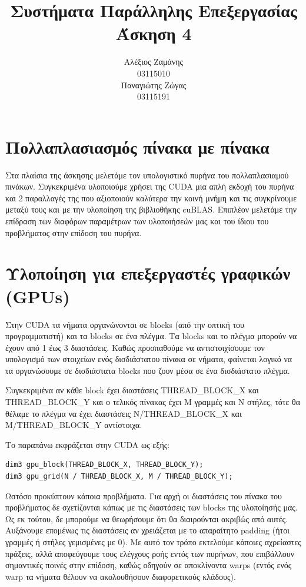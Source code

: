 \documentclass[titlepage]{article}
\begin{document}
\title{Συστήματα Παράλληλης Επεξεργασίας\\
    Άσκηση 4}
\author{Αλέξιος Ζαμάνης\\
    03115010\\
    Παναγιώτης Ζώγας\\
    03115191}

\maketitle

\section*{Πολλαπλασιασμός πίνακα με πίνακα}

Στα πλαίσια της άσκησης μελετάμε τον υπολογιστικό πυρήνα του πολλαπλασιαμού πινάκων. Συγκεκριμένα υλοποιούμε χρήσει της CUDA μια απλή εκδοχή του πυρήνα και 2 παραλλαγές της που αξιοποιούν καλύτερα την κοινή μνήμη και τις συγκρίνουμε μεταξύ τους και με την υλοποίηση της βιβλιοθήκης cuBLAS. Επιπλέον μελετάμε την επίδραση των διαφόρων παραμέτρων των υλοποιήσεών μας και του ίδιου του προβλήματος στην επίδοση του πυρήνα.

\section{Υλοποίηση για επεξεργαστές γραφικών (GPUs)}

Στην CUDA τα νήματα οργανώνονται σε blocks (από την οπτική του προγραμματιστή) και τα blocks σε ένα πλέγμα. Τα blocks και το πλέγμα μπορούν να έχουν από 1 έως 3 διαστάσεις. Καθώς προσπαθούμε να αντιστοιχίσουμε τον υπολογισμό των στοιχείων ενός δισδιάστατου πίνακα σε νήματα, φαίνεται λογικό να τα οργανώσουμε σε δισδιάστατα blocks που ζουν μέσα σε ένα δισδιάστατο πλέγμα.

Συγκεκριμένα αν κάθε block έχει διαστάσεις THREAD\_BLOCK\_X και THREAD\_BLOCK\_Y και ο τελικός πίνακας έχει M γραμμές και N στήλες, τότε θα θέλαμε το πλέγμα να έχει διαστάσεις N/THREAD\_BLOCK\_X και M/THREAD\_BLOCK\_Y αντίστοιχα.

Το παραπάνω εκφράζεται στην CUDA ως εξής:

\begin{verbatim}
dim3 gpu_block(THREAD_BLOCK_X, THREAD_BLOCK_Y);
dim3 gpu_grid(N / THREAD_BLOCK_X, M / THREAD_BLOCK_Y);
\end{verbatim}

Ωστόσο προκύπτουν κάποια προβλήματα. Για αρχή οι διαστάσεις του πίνακα του προβλήματος δε σχετίζονται κάπως με τις διαστάσεις των blocks της υλοποίησής μας. Ως εκ τούτου, δε μπορούμε να θεωρήσουμε ότι θα διαιρούνται ακριβώς από αυτές. Αυξάνουμε επομένως τις διαστάσεις αν χρειάζεται με το απαραίτητο padding (ήτοι γραμμές ή στήλες γεμισμένες με 0). Με αυτό τον τρόπο εκτελούμε κάποιες αχρείαστες πράξεις, αλλά αποφεύγουμε τους ελέγχους ροής εντός των πυρήνων, που επιβάλλουν σημαντικές ποινές στην επίδοση, καθώς οδηγούν σε αποκλίνοντα warps (εντός ενός warp τα νήματα θέλουν να ακολουθήσουν διαφορετικούς κλάδους).
\end{document}
